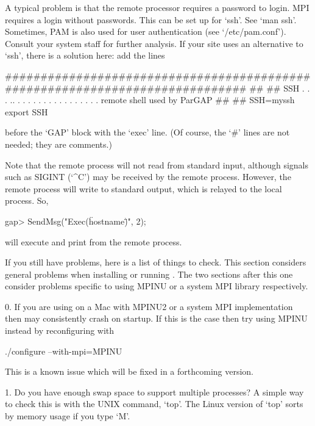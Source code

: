 A typical problem is that the remote processor  requires  a  password  to
login.   MPI   requires   a   login   without    passwords.    This   can
be set up for `ssh'.  See `man ssh'. Sometimes, PAM is also used for user
authentication (see `/etc/pam.conf').  Consult  your  system  staff   for
further analysis. If your site uses an alternative to `ssh', there  is  a
solution here: add the lines

\begintt
#############################################################################
##
##  SSH . . . .. . . . . . . . . . . . . . . . .  remote shell used by ParGAP
##
##
SSH=myssh
export SSH
\endtt

before the `GAP' block with the `exec' line. (Of course, the  `\#'  lines
are not needed; they are comments.)

Note that the remote {\ParGAP} process will not read from standard input,
although signals such as SIGINT (`\^{}C') may be received by  the  remote
process. However, the remote {\ParGAP} process  will  write  to  standard
output, which is relayed to the local process. So,

\beginexample
gap> SendMsg("Exec(\"hostname\")", 2);
\endexample

will execute and print from the remote process.


If you still have problems, here is a list of things to check. This section
considers general problems when installing or running {\ParGAP}. The two 
sections after this one consider problems specific to using MPINU or a system
MPI library respectively.

\beginlist
\item{0.}
    If you are using {\ParGAP} on a Mac with MPINU2 or a system MPI 
    implementation then {\ParGAP} may consistently crash on startup. If this
    is the case then try using MPINU instead by reconfiguring {\ParGAP} with

./configure --with-mpi=MPINU

\item{}
    This is a known issue which will be fixed in a forthcoming version.

\item{1.}
    Do you have enough swap space to support multiple {\GAP} processes? A
    simple way to check this is with the UNIX command, `top'.  The  Linux
    version of `top' sorts by memory usage if you type `M'.

